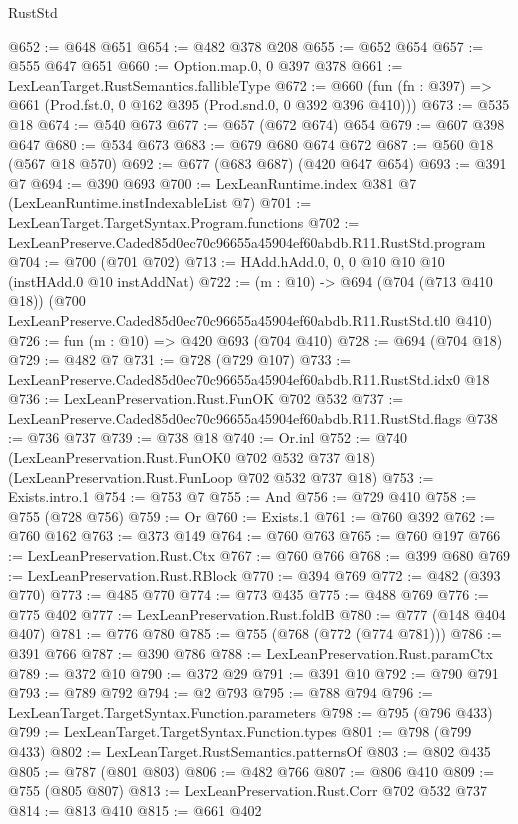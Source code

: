 \begin{lexlean}{RustStd}
\begin{coremodule}
@652 := @648 @651
@654 := @482 @378 @208
@655 := @652 @654
@657 := @555 @647 @651
@660 := Option.map.{0, 0} @397 @378
@661 := LexLeanTarget.RustSemantics.fallibleType
@672 := @660 (fun (fn : @397) => @661 (Prod.fst.{0, 0} @162 @395 (Prod.snd.{0, 0} @392 @396 @410)))
@673 := @535 @18
@674 := @540 @673
@677 := @657 (@672 @674) @654
@679 := @607 @398 @647
@680 := @534 @673
@683 := @679 @680 @674 @672
@687 := @560 @18 (@567 @18 @570)
@692 := @677 (@683 @687) (@420 @647 @654)
@693 := @391 @7
@694 := @390 @693
@700 := LexLeanRuntime.index @381 @7 (LexLeanRuntime.instIndexableList @7)
@701 := LexLeanTarget.TargetSyntax.Program.functions
@702 := LexLeanPreserve.Caded85d0ec70c96655a45904ef60abdb.R11.RustStd.program
@704 := @700 (@701 @702)
@713 := HAdd.hAdd.{0, 0, 0} @10 @10 @10 (instHAdd.{0} @10 instAddNat)
@722 := (m : @10) ->
  @694
    (@704 (@713 @410 @18))
    (@700 LexLeanPreserve.Caded85d0ec70c96655a45904ef60abdb.R11.RustStd.tl0 @410)
@726 := fun (m : @10) => @420 @693 (@704 @410)
@728 := @694 (@704 @18)
@729 := @482 @7
@731 := @728 (@729 @107)
@733 := LexLeanPreserve.Caded85d0ec70c96655a45904ef60abdb.R11.RustStd.idx0 @18
@736 := LexLeanPreservation.Rust.FunOK @702 @532
@737 := LexLeanPreserve.Caded85d0ec70c96655a45904ef60abdb.R11.RustStd.flags
@738 := @736 @737
@739 := @738 @18
@740 := Or.inl
@752 := @740
    (LexLeanPreservation.Rust.FunOK0 @702 @532 @737 @18)
    (LexLeanPreservation.Rust.FunLoop @702 @532 @737 @18)
@753 := Exists.intro.{1}
@754 := @753 @7
@755 := And
@756 := @729 @410
@758 := @755 (@728 @756)
@759 := Or
@760 := Exists.{1}
@761 := @760 @392
@762 := @760 @162
@763 := @373 @149
@764 := @760 @763
@765 := @760 @197
@766 := LexLeanPreservation.Rust.Ctx
@767 := @760 @766
@768 := @399 @680
@769 := LexLeanPreservation.Rust.RBlock
@770 := @394 @769
@772 := @482 (@393 @770)
@773 := @485 @770
@774 := @773 @435
@775 := @488 @769
@776 := @775 @402
@777 := LexLeanPreservation.Rust.foldB
@780 := @777 (@148 @404 @407)
@781 := @776 @780
@785 := @755 (@768 (@772 (@774 @781)))
@786 := @391 @766
@787 := @390 @786
@788 := LexLeanPreservation.Rust.paramCtx
@789 := @372 @10
@790 := @372 @29
@791 := @391 @10
@792 := @790 @791
@793 := @789 @792
@794 := @2 @793
@795 := @788 @794
@796 := LexLeanTarget.TargetSyntax.Function.parameters
@798 := @795 (@796 @433)
@799 := LexLeanTarget.TargetSyntax.Function.types
@801 := @798 (@799 @433)
@802 := LexLeanTarget.RustSemantics.patternsOf
@803 := @802 @435
@805 := @787 (@801 @803)
@806 := @482 @766
@807 := @806 @410
@809 := @755 (@805 @807)
@813 := LexLeanPreservation.Rust.Corr @702 @532 @737
@814 := @813 @410
@815 := @661 @402

\end{coremodule}
\end{lexlean}
